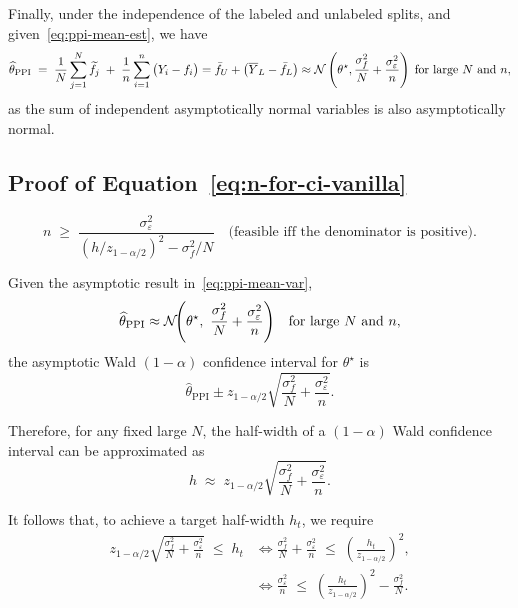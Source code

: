 
\noindent Finally, under the independence of the labeled and unlabeled splits, and given~\eqref{eq:ppi-mean-est}, we have \[
\widehat\theta_{\mathrm{PPI}}
\;=\;
\frac{1}{N}\sum_{j=1}^N \widetilde f_j
\;+\;\frac{1}{n}\sum_{i=1}^n \big(Y_i-f_i\big)=
\bar f_U+\left(\overline{Y}_L-\bar f_L\right)\approx\mathcal{N}\left(\theta^\star,\frac{\sigma_f^2}{N}+\frac{\sigma_\varepsilon^2}{n}\right)\;\text{for large $N$ and $n$},
\] as the sum of independent asymptotically normal variables is also asymptotically normal.

\subsection{Proof of Equation~\eqref{eq:n-for-ci-vanilla}}
\label{subsec:n-for-ci-vanilla}
\begin{equation*}
n \;\ge\; \frac{\sigma_\varepsilon^2}{(h/z_{1-\alpha/2})^2 - \sigma_f^2/N}
\quad\text{(feasible iff the denominator is positive).}
\end{equation*}


\noindent Given the asymptotic result in~\eqref{eq:ppi-mean-var}, \[
\widehat\theta_{\mathrm{PPI}} \approx \mathcal{N}\!\Bigg(\theta^\star,\ \frac{\sigma_f^2}{N} + \frac{\sigma_\varepsilon^2}{n}\Bigg)\quad\text{for large $N$ and $n$},
\]the asymptotic Wald $(1-\alpha)$ confidence interval for $\theta^\star$ is \[\widehat\theta_{\mathrm{PPI}}
\pm z_{1-\alpha/2}
\sqrt{\frac{\sigma_f^2}{N}+\frac{\sigma_\varepsilon^2}{n}}.\]

\noindent Therefore, for any fixed large $N$, the half-width of a $(1-\alpha)$ Wald confidence interval can be approximated as
\[
h\;\approx\;z_{1-\alpha/2}\sqrt{\frac{\sigma_f^2}{N} + \frac{\sigma_\varepsilon^2}{n}}.
\]

\noindent
It follows that, to achieve a target half-width $h_t$, we require
\begin{align*}
z_{1-\alpha/2}\sqrt{\frac{\sigma_f^2}{N} + \frac{\sigma_\varepsilon^2}{n}} \;\le\; h_t
&\iff \frac{\sigma_f^2}{N} + \frac{\sigma_\varepsilon^2}{n} \;\le\; \left(\frac{h_t}{z_{1-\alpha/2}}\right)^2,\\[0.3em]
&\iff \frac{\sigma_\varepsilon^2}{n} \;\le\; \left(\frac{h_t}{z_{1-\alpha/2}}\right)^2 - \frac{\sigma_f^2}{N}.
\end{align*}

